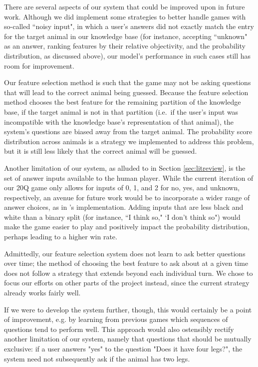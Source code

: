 \documentclass[11pt,a4paper]{article}
\begin{document}
There are several aspects of our system that could be improved upon in future work. 
Although we did implement some strategies to better handle games with so-called ``noisy input", in which a user's answers did not exactly match the entry for the target animal in our knowledge base (for instance, accepting ``unknown" as an answer, ranking features by their relative objectivity, and the probability distribution, as discussed above), our model's performance in such cases still has room for improvement. 

Our feature selection method is such that the game may not be asking questions that will lead to the correct animal being guessed. 
Because the feature selection method chooses the best feature for the remaining partition of the knowledge base, if the target animal is not in that partition (i.e.\ if the user's input was incompatible with the knowledge base's representation of that animal), the system's questions are biased away from the target animal. 
The probability score distribution across animals is a strategy we implemented to address this problem, but it is still less likely that the correct animal will be guessed.

Another limitation of our system, as alluded to in Section \ref{sec:litreview}, is the set of answer inputs available to the human player. While the current iteration of our 20Q game only allows for inputs of 0, 1, and 2 for no, yes, and unknown, respectively, an avenue for future work would be to incorporate a wider range of answer choices, as in \citet{Burgener2006}'s implementation. Adding inputs that are less black and white than a binary split (for instance, ``I think so," `I don't think so") would make the game easier to play and positively impact the probability distribution, perhaps leading to a higher win rate. 

Admittedly, our feature selection system does not learn to ask better questions over time; the method of choosing the best feature to ask about at a given time does not follow a strategy that extends beyond each individual turn. We chose to focus our efforts on other parts of the project instead, since the current strategy already works fairly well.

If we were to develop the system further, though, this would certainly be a point of improvement, e.g. by learning from previous games which sequences of questions tend to perform well. This approach would also ostensibly rectify another limitation of our system, namely that questions that should be mutually exclusive: if a user answers "yes" to the question "Does it have four legs?", the system need not subsequently ask if the animal has two legs. 
\end{document}
